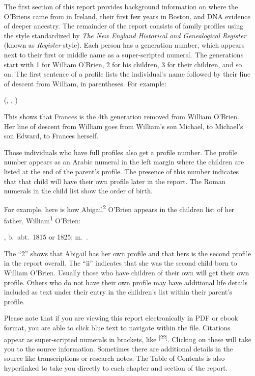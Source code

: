 The first section of this report provides background information on where the O'Briens came from in Ireland, their first few years in Boston, and DNA evidence of deeper ancestry. The remainder of the report consists of family profiles using the style standardized by \textit{The New England Historical and Genealogical Register} (known as \textit{Register} style). Each person has a generation number, which appears next to their first or middle name as a super-scripted numeral. The generations start with 1 for William O'Brien, 2 for his children, 3 for their children, and so on. The first sentence of a profile lists the individual's name followed by their line of descent from William, in parentheses. For example:

\vspace{\baselineskip}
 (, , )
\vspace{\baselineskip}

This shows that Frances is the 4th generation removed from William O'Brien. Her line of descent from William goes from William's son Michael, to Michael's son Edward, to Frances herself.

Those individuals who have full profiles also get a profile number. The profile number appears as an Arabic numeral in the left margin where the children are listed at the end of the parent's profile. The presence of this number indicates that that child will have their own profile later in the report. The Roman numerals in the child list show the order of birth. 

For example, here is how Abigail\textsuperscript{2} O'Brien appears in the children list of her father, William\textsuperscript{1} O'Brien:

\vspace{\baselineskip}
	\begin{Kids}
	, b.\ abt.\ 1815 or 1825; m.\ .
	\end{Kids}
\vspace{\baselineskip}

The ``2'' shows that Abigail has her own profile and that hers is the second profile in the report overall. The ``ii'' indicates that she was the second child born to William O'Brien. Usually those who have children of their own will get their own profile. Others who do not have their own profile may have additional life details included as text under their entry in the children's list within their parent's profile.

Please note that if you are viewing this report electronically in PDF or ebook format, you are able to click blue text to navigate within the file. Citations appear as super-scripted numerals in brackets, like \textsuperscript{[22]}. Clicking on these will take you to the source information. Sometimes there are additional details in the source like transcriptions or research notes. The Table of Contents is also hyperlinked to take you directly to each chapter and section of the report.
